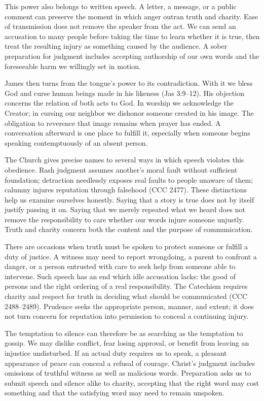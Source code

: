 This power also belongs to written speech. A letter, a message, or a public comment can preserve the moment in which anger outran truth and charity. Ease of transmission does not remove the speaker from the act. We can send an accusation to many people before taking the time to learn whether it is true, then treat the resulting injury as something caused by the audience. A sober preparation for judgment includes accepting authorship of our own words and the foreseeable harm we willingly set in motion.

James then turns from the tongue's power to its contradiction. With it we bless God and curse human beings made in his likeness (Jas 3:9--12). His objection concerns the relation of both acts to God. In worship we acknowledge the Creator; in cursing our neighbor we dishonor someone created in his image. The obligation to reverence that image remains when prayer has ended. A conversation afterward is one place to fulfill it, especially when someone begins speaking contemptuously of an absent person.

The Church gives precise names to several ways in which speech violates this obedience. Rash judgment assumes another's moral fault without sufficient foundation; detraction needlessly exposes real faults to people unaware of them; calumny injures reputation through falsehood (CCC 2477). These distinctions help us examine ourselves honestly. Saying that a story is true does not by itself justify passing it on. Saying that we merely repeated what we heard does not remove the responsibility to care whether our words injure someone unjustly. Truth and charity concern both the content and the purpose of communication.

There are occasions when truth must be spoken to protect someone or fulfill a duty of justice. A witness may need to report wrongdoing, a parent to confront a danger, or a person entrusted with care to seek help from someone able to intervene. Such speech has an end which idle accusation lacks: the good of persons and the right ordering of a real responsibility. The Catechism requires charity and respect for truth in deciding what should be communicated (CCC 2488--2489). Prudence seeks the appropriate person, manner, and extent; it does not turn concern for reputation into permission to conceal a continuing injury.

The temptation to silence can therefore be as searching as the temptation to gossip. We may dislike conflict, fear losing approval, or benefit from leaving an injustice undisturbed. If an actual duty requires us to speak, a pleasant appearance of peace can conceal a refusal of courage. Christ's judgment includes omissions of truthful witness as well as malicious words. Preparation asks us to submit speech and silence alike to charity, accepting that the right word may cost something and that the satisfying word may need to remain unspoken.

